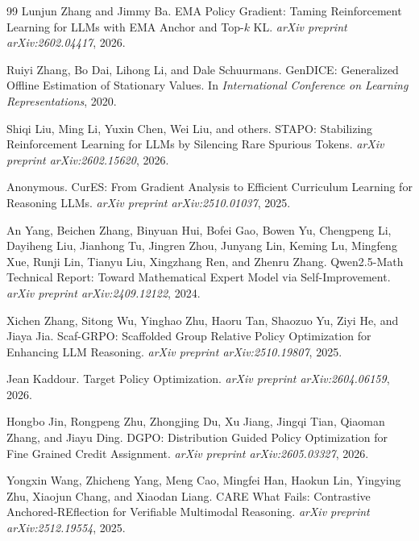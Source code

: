 \documentclass{article}
\begin{document}
\begin{thebibliography}{99}
Lunjun Zhang and Jimmy Ba.
\newblock EMA Policy Gradient: Taming Reinforcement Learning for LLMs with EMA Anchor and Top-$k$ KL.
\newblock \emph{arXiv preprint arXiv:2602.04417}, 2026.

Ruiyi Zhang, Bo Dai, Lihong Li, and Dale Schuurmans.
\newblock GenDICE: Generalized Offline Estimation of Stationary Values.
\newblock In \emph{International Conference on Learning Representations}, 2020.

Shiqi Liu, Ming Li, Yuxin Chen, Wei Liu, and others.
\newblock STAPO: Stabilizing Reinforcement Learning for LLMs by Silencing Rare Spurious Tokens.
\newblock \emph{arXiv preprint arXiv:2602.15620}, 2026.

Anonymous.
\newblock CurES: From Gradient Analysis to Efficient Curriculum Learning for Reasoning LLMs.
\newblock \emph{arXiv preprint arXiv:2510.01037}, 2025.


An Yang, Beichen Zhang, Binyuan Hui, Bofei Gao, Bowen Yu, Chengpeng Li, Dayiheng Liu, Jianhong Tu, Jingren Zhou, Junyang Lin, Keming Lu, Mingfeng Xue, Runji Lin, Tianyu Liu, Xingzhang Ren, and Zhenru Zhang.
\newblock Qwen2.5-Math Technical Report: Toward Mathematical Expert Model via Self-Improvement.
\newblock \emph{arXiv preprint arXiv:2409.12122}, 2024.


Xichen Zhang, Sitong Wu, Yinghao Zhu, Haoru Tan, Shaozuo Yu, Ziyi He, and Jiaya Jia.
\newblock Scaf-GRPO: Scaffolded Group Relative Policy Optimization for Enhancing LLM Reasoning.
\newblock \emph{arXiv preprint arXiv:2510.19807}, 2025.


Jean Kaddour.
\newblock Target Policy Optimization.
\newblock \emph{arXiv preprint arXiv:2604.06159}, 2026.

Hongbo Jin, Rongpeng Zhu, Zhongjing Du, Xu Jiang, Jingqi Tian, Qiaoman Zhang, and Jiayu Ding.
\newblock DGPO: Distribution Guided Policy Optimization for Fine Grained Credit Assignment.
\newblock \emph{arXiv preprint arXiv:2605.03327}, 2026.

Yongxin Wang, Zhicheng Yang, Meng Cao, Mingfei Han, Haokun Lin, Yingying Zhu, Xiaojun Chang, and Xiaodan Liang.
\newblock CARE What Fails: Contrastive Anchored-REflection for Verifiable Multimodal Reasoning.
\newblock \emph{arXiv preprint arXiv:2512.19554}, 2025.


\end{thebibliography}
\end{document}
